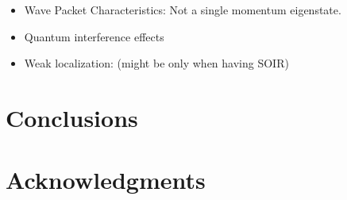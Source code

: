 \documentclass[twocolumn]{revtex4-2}
\begin{document}
    \begin{itemize}
        \item Wave Packet Characteristics: Not a single momentum eigenstate.
        \item Quantum interference effects\cite{MolgadoMex2018}
        \item Weak localization: (might be only when having SOIR)
    \end{itemize}

    \section{Conclusions}\label{sec:conclusions}


    \section*{Acknowledgments}

    
    
\end{document}
